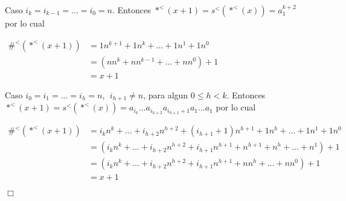 Caso \(i_{k}=i_{k-1}=...=i_{0}=n\). Entonces \(\ast ^{< }(x+1)=s^{< }(\ast ^{< }(x))=a_{1}^{k+2}\) por lo cual

\(\displaystyle \begin{array}{ll} \#^{< }(\ast ^{< }(x+1)) & =1n^{k+1}+1n^{k}+...+1n^{1}+1n^{0} \\ & =\left( nn^{k}+nn^{k-1}+...+nn^{0}\right) +1 \\ & =x+1 \end{array} \)

Caso \(i_{0}=i_{1}=...=i_{h}=n\), \(\;i_{h+1}\not=n\), para algun \( 0\leq h< k\). Entonces \(\ast ^{< }(x+1)=s^{< }(\ast ^{< }(x))=a_{i_{k}}...a_{i_{h+2}}a_{i_{h+1}+1}a_{1}...a_{1}\) por lo cual

\(\displaystyle \begin{array}{ll} \#^{< }(\ast ^{< }(x+1)) & =i_{k}n^{k}+...+i_{h+2}n^{h+2}+(i_{h+1}+1)n^{h+1}+1n^{h}+...+1n^{1}+1n^{0} \\ & =\left( i_{k}n^{k}+...+i_{h+2}n^{h+2}+i_{h+1}n^{h+1}+n^{h+1}+n^{h}+...+n^{1}\right) +1 \\ & =\left( i_{k}n^{k}+...+i_{h+2}n^{h+2}+i_{h+1}n^{h+1}+nn^{h}+...+nn^{0}\right) +1 \\ & =x+1 \end{array} \)

\(\Box\)
